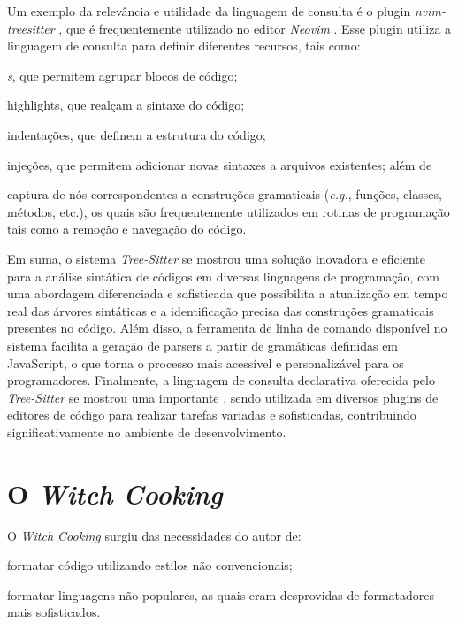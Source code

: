 \documentclass[11pt, a4paper, english, openright, twoside, brazil]{abntex2}
\begin{document}
  Um exemplo da relevância e utilidade da linguagem de consulta é o plugin
  \textit{nvim-treesitter} \cite{nvim-treesitter-2023-nvim}, que é
  frequentemente utilizado no editor \textit{Neovim}
  \cite{neovim-2014-hyperextensible}. Esse plugin utiliza a linguagem de
  consulta para definir diferentes recursos, tais como:
  \begin{inparaenum}
    \item \textit{s}, que permitem agrupar blocos de código;
    \item highlights, que realçam a sintaxe do código;
    \item indentações, que definem a estrutura do código;
    \item injeções, que permitem adicionar novas sintaxes a arquivos
          existentes; além de
    \item captura de nós correspondentes a construções gramaticais
          (\textit{e.g.}, funções, classes, métodos, etc.), os quais são
          frequentemente utilizados em rotinas de programação tais como a
          remoção e navegação do código.
  \end{inparaenum}

  Em suma, o sistema \textit{Tree-Sitter} se mostrou uma solução inovadora e
  eficiente para a análise sintática de códigos em diversas linguagens de
  programação, com uma abordagem diferenciada e sofisticada que possibilita a
  atualização em tempo real das árvores sintáticas e a identificação precisa
  das construções gramaticais presentes no código. Além disso, a ferramenta de
  linha de comando disponível no sistema facilita a geração de parsers a partir
  de gramáticas definidas em JavaScript, o que torna o processo mais acessível
  e personalizável para os programadores. Finalmente, a linguagem de consulta
  declarativa oferecida pelo \textit{Tree-Sitter} se mostrou uma importante
  \textit{}, sendo utilizada em diversos plugins de editores de
  código para realizar tarefas variadas e sofisticadas, contribuindo
  significativamente no ambiente de desenvolvimento.


  \chapter{O \textit{Witch Cooking}}

  O \textit{Witch Cooking} surgiu das necessidades do autor de:
  \begin{inparaenum}
    \item formatar código utilizando estilos não convencionais;
    \item formatar linguagens não-populares, as quais eram desprovidas de
          formatadores mais sofisticados.
  \end{inparaenum}


  \postextual
  \printbibliography
\end{document}
